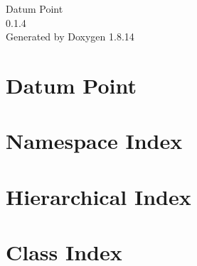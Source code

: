 \documentclass[twoside]{book}
\newcommand{\+}{\discretionary{\mbox{\scriptsize$\hookleftarrow$}}{}{}}
\newcommand{\clearemptydoublepage}{%
  \newpage{\pagestyle{empty}\cleardoublepage}%
}
\begin{document}
\hypersetup{pageanchor=false,
             bookmarksnumbered=true,
             pdfencoding=unicode
            }
\begin{titlepage}
\vspace*{7cm}
\begin{center}%
{\Large Datum Point \\[1ex]\large 0.\+1.\+4 }\\
\vspace*{1cm}
{\large Generated by Doxygen 1.8.14}\\
\end{center}
\end{titlepage}
\clearemptydoublepage
{}
\tableofcontents
\clearemptydoublepage
{}
\hypersetup{pageanchor=true}

\chapter{Datum Point}
\label{md__d_1__work__git_hub_datum-point__r_e_a_d_m_e}

\chapter{Namespace Index}

\chapter{Hierarchical Index}

\chapter{Class Index}

\end{document}
